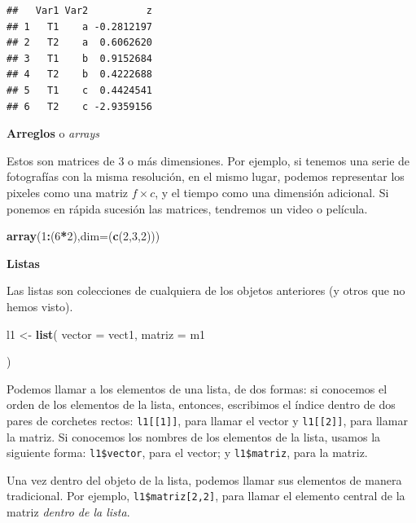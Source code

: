 \documentclass[12pt,letterpaper,]{book}
\newenvironment{Shaded}{\begin{snugshade}}{\end{snugshade}}
\newcommand{\KeywordTok}[1]{\textcolor[rgb]{0.13,0.29,0.53}{\textbf{#1}}}
\newcommand{\DataTypeTok}[1]{\textcolor[rgb]{0.13,0.29,0.53}{#1}}
\newcommand{\DecValTok}[1]{\textcolor[rgb]{0.00,0.00,0.81}{#1}}
\newcommand{\StringTok}[1]{\textcolor[rgb]{0.31,0.60,0.02}{#1}}
\newcommand{\OperatorTok}[1]{\textcolor[rgb]{0.81,0.36,0.00}{\textbf{#1}}}
\newcommand{\NormalTok}[1]{#1}
\begin{document}
\begin{verbatim}
##   Var1 Var2          z
## 1   T1    a -0.2812197
## 2   T2    a  0.6062620
## 3   T1    b  0.9152684
## 4   T2    b  0.4222688
## 5   T1    c  0.4424541
## 6   T2    c -2.9359156
\end{verbatim}

\textbf{Arreglos} o \emph{arrays}

Estos son matrices de 3 o más dimensiones. Por ejemplo, si tenemos una
serie de fotografías con la misma resolución, en el mismo lugar, podemos
representar los pixeles como una matriz \(f\times c\), y el tiempo como
una dimensión adicional. Si ponemos en rápida sucesión las matrices,
tendremos un video o película.

\begin{Shaded}
\begin{Highlighting}[]
\KeywordTok{array}\NormalTok{(}\DecValTok{1}\OperatorTok{:}\NormalTok{(}\DecValTok{6}\OperatorTok{*}\DecValTok{2}\NormalTok{),}\DataTypeTok{dim=}\NormalTok{(}\KeywordTok{c}\NormalTok{(}\DecValTok{2}\NormalTok{,}\DecValTok{3}\NormalTok{,}\DecValTok{2}\NormalTok{)))}
\end{Highlighting}
\end{Shaded}

\textbf{Listas}

Las listas son colecciones de cualquiera de los objetos anteriores (y
otros que no hemos visto).

\begin{Shaded}
\begin{Highlighting}[]
\NormalTok{l1 <-}\StringTok{ }\KeywordTok{list}\NormalTok{(}
  \DataTypeTok{vector =}\NormalTok{ vect1,}
  \DataTypeTok{matriz =}\NormalTok{ m1}
  
\NormalTok{)}
\end{Highlighting}
\end{Shaded}

Podemos llamar a los elementos de una lista, de dos formas: si conocemos
el orden de los elementos de la lista, entonces, escribimos el índice
dentro de dos pares de corchetes rectos: \texttt{l1{[}{[}1{]}{]}}, para
llamar el vector y \texttt{l1{[}{[}2{]}{]}}, para llamar la matriz. Si
conocemos los nombres de los elementos de la lista, usamos la siguiente
forma: \texttt{l1\$vector}, para el vector; y \texttt{l1\$matriz}, para
la matriz.

Una vez dentro del objeto de la lista, podemos llamar sus elementos de
manera tradicional. Por ejemplo, \texttt{l1\$matriz{[}2,2{]}}, para
llamar el elemento central de la matriz \emph{dentro de la lista}.
\end{document}
